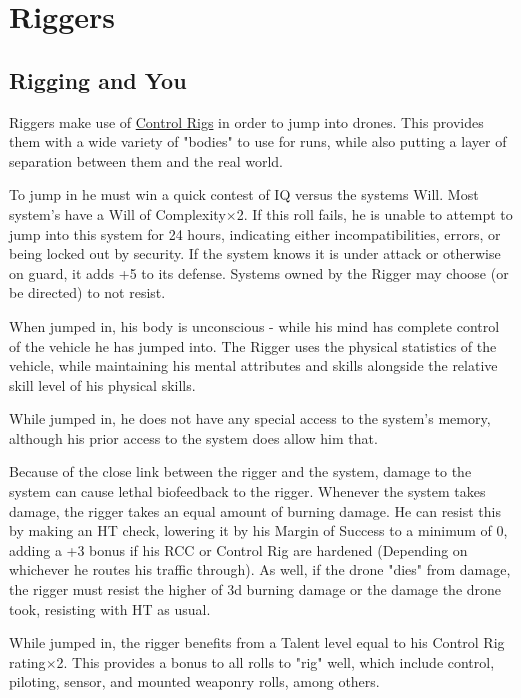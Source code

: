 \section{Riggers}\label{riggers}
\begin{multicols*}{3}
	
	\subsection{Rigging and You}\label{rigger_rules}
	
	Riggers make use of \hyperref[control_rig]{Control Rigs} in order to jump into drones. This provides them with a wide variety of "bodies" to use for runs, while also putting a layer of separation between them and the real world.
	
	To jump in he must win a quick contest of IQ versus the systems Will. Most system's have a Will of Complexity\(\times\)2. If this roll fails, he is unable to attempt to jump into this system for 24 hours, indicating either incompatibilities, errors, or being locked out by security. If the system knows it is under attack or otherwise on guard, it adds +5 to its defense. Systems owned by the Rigger may choose (or be directed) to not resist.
	
	When jumped in, his body is unconscious - while his mind has complete control of the vehicle he has jumped into. The Rigger uses the physical statistics of the vehicle, while maintaining his mental attributes and skills alongside the relative skill level of his physical skills.
	
	While jumped in, he does not have any special access to the system's memory, although his prior access to the system does allow him that.
	
	Because of the close link between the rigger and the system, damage to the system can cause lethal biofeedback to the rigger. Whenever the system takes damage, the rigger takes an equal amount of burning damage. He can resist this by making an HT check, lowering it by his Margin of Success to a minimum of 0, adding a +3 bonus if his RCC or Control Rig are hardened (Depending on whichever he routes his traffic through). As well, if the drone "dies" from damage, the rigger must resist the higher of 3d burning damage or the damage the drone took, resisting with HT as usual. 
	
	While jumped in, the rigger benefits from a Talent level equal to his Control Rig rating$\times$2. This provides a bonus to all rolls to "rig" well, which include control, piloting, sensor, and mounted weaponry rolls, among others.
	

\end{multicols*}
